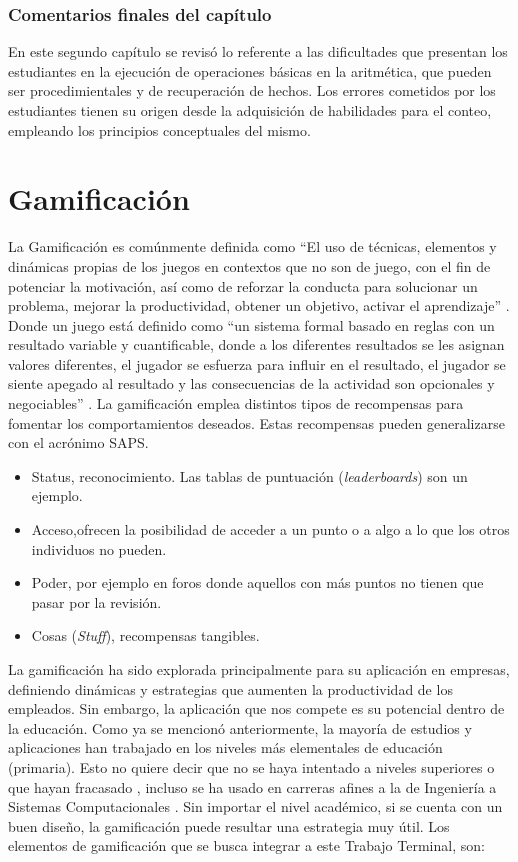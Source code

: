 \documentclass{article}
\begin{document}
\subsubsection{Comentarios finales del capítulo} 

En este segundo capítulo se revisó lo referente a las dificultades que presentan los estudiantes en la ejecución de operaciones básicas en la aritmética, que pueden ser procedimientales y de recuperación de hechos. Los errores cometidos por los estudiantes tienen su origen desde la adquisición de habilidades para el conteo, empleando los principios conceptuales del mismo.
\pagebreak
\section{Gamificación}
La Gamificación es comúnmente definida como “El uso de técnicas, elementos y dinámicas propias de los juegos en contextos que no son de juego, con el fin de potenciar la motivación, así como de reforzar la conducta para solucionar un problema, mejorar la productividad, obtener un objetivo, activar el aprendizaje” \cite{robson2015all}. Donde un juego está definido como “un sistema formal basado en reglas con un resultado variable y cuantificable, donde a los diferentes resultados se les asignan valores diferentes, el jugador se esfuerza para influir en el resultado, el jugador se siente apegado al resultado y las consecuencias de la actividad son opcionales y negociables” \cite{zichermann2011gamification}.
La gamificación emplea distintos tipos de recompensas para fomentar los comportamientos deseados. Estas recompensas pueden generalizarse con el acrónimo SAPS.
\begin{itemize}
	\item Status, reconocimiento. Las tablas de puntuación (\emph{leaderboards}) son un ejemplo.
	\item Acceso,ofrecen la posibilidad de acceder a un punto o a algo a lo que los otros individuos no pueden.
	\item Poder, por ejemplo en foros donde aquellos con más puntos no tienen que pasar por la revisión.
	\item Cosas (\emph{Stuff}), recompensas tangibles. 
\end{itemize}

La gamificación ha sido explorada principalmente para su aplicación en empresas, definiendo dinámicas y estrategias que aumenten la productividad de los empleados. Sin embargo, la aplicación que nos compete es su potencial dentro de la educación. Como ya se mencionó anteriormente, la mayoría de estudios y aplicaciones han trabajado en los niveles más elementales de educación (primaria)\cite{rodrigues2017math}. Esto no quiere decir que no se haya intentado a niveles superiores o que hayan fracasado \cite{wiggins2016overview,sanchez2017classcraft,tan2018}, incluso se ha usado
en carreras afines a la de Ingeniería a Sistemas Computacionales \cite{ibanez2014gamification}. Sin importar el nivel académico, si
se cuenta con un buen diseño, la gamificación puede resultar una estrategia muy útil. Los elementos de
gamificación que se busca integrar a este Trabajo Terminal, son:
\end{document}

